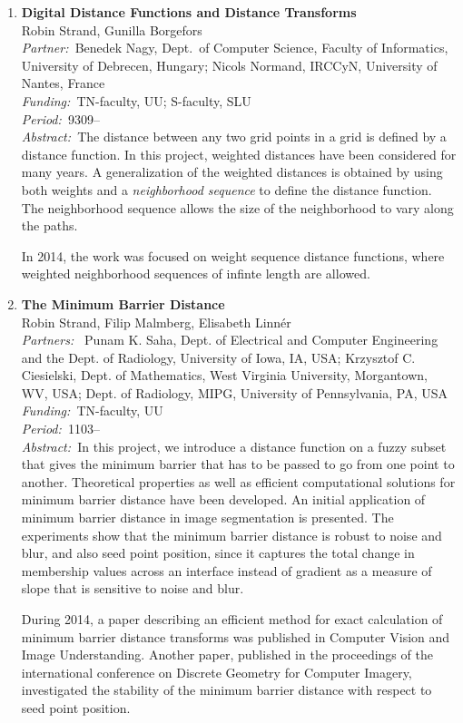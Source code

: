 \documentclass[10pt, a4paper]{article}
\newcommand{\period}{\emph{Period:~}}
\newcommand{\aabstract}[1]{\emph{Abstract:~}#1}
\newcommand{\ffunding}[1]{\emph{Funding:~}#1\\}
\newcommand{\ppartner}[1]{\emph{Partner:~}#1\\}
\newcommand{\ppartners}[1]{\emph{Partners:~}#1\\}
\newcommand{\pperiod}[1]{\emph{Period:~}#1\\}
\begin{document}
{\begin{enumerate}
\item 
\label{proj:DT}
\textbf{Digital Distance Functions and Distance Transforms} \\
Robin Strand, Gunilla Borgefors \\
\ppartner{Benedek Nagy, Dept.~of Computer Science, Faculty of Informatics, University of Debrecen, Hungary; Nicols Normand, IRCCyN, University of Nantes, France}
\ffunding{TN-faculty, UU; S-faculty, SLU}
\pperiod{9309--}
\aabstract{The distance between any two grid points in a grid is defined by a distance function. In this project, weighted distances have been considered for many years. A generalization of the weighted distances is obtained by using both weights and a \textit{neighborhood sequence} to define the distance function. The neighborhood sequence allows the size of the neighborhood to vary along the paths. 

In 2014, the work was focused on weight sequence distance functions, where weighted neighborhood sequences of infinte length are allowed.}


\item 
\label{project:minimum_barrier_distance}
\textbf{The Minimum Barrier Distance }\\
Robin Strand, Filip Malmberg, Elisabeth Linn\'{e}r\\
\ppartners{ Punam K. Saha, Dept. of Electrical and Computer Engineering and the Dept. of Radiology, University of Iowa, IA, USA; Krzysztof C. Ciesielski, Dept. of Mathematics, West Virginia University, Morgantown, WV, USA; Dept. of Radiology, MIPG, University of Pennsylvania, PA, USA }
\ffunding{TN-faculty, UU}
\period 1103--\\
\aabstract{In this project, we introduce a distance function on a fuzzy subset that gives the minimum barrier that has to be passed to go from one point to another. Theoretical properties as well as efficient computational solutions for minimum barrier distance have been developed. An initial application of minimum barrier distance in image segmentation is presented. The experiments show that the minimum barrier distance is robust to noise and blur, and also seed point position, since it captures the total change in membership values across an interface instead of gradient as a measure of slope that is sensitive to noise and blur.

During 2014, a paper describing an efficient method for exact calculation of minimum barrier distance transforms was published in Computer Vision and Image Understanding. Another paper, published in the proceedings of the international conference on Discrete Geometry for Computer Imagery, investigated the stability of the minimum barrier distance with respect to seed point position.}


\end{enumerate}}
\end{document}
